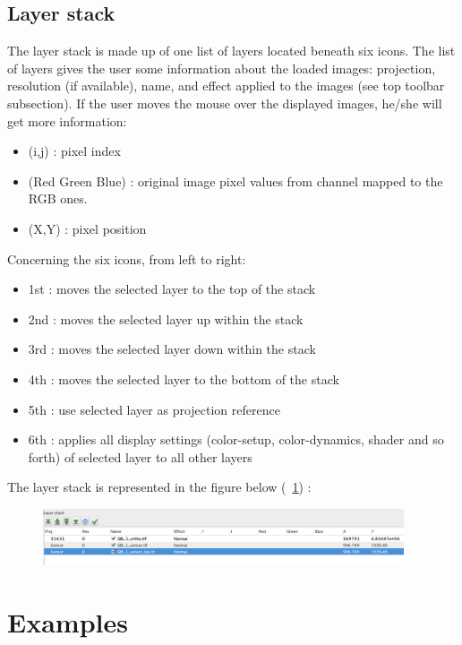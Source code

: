 \subsection{Layer stack}

The layer stack is made up of one list of layers located beneath six icons.
The list of layers gives the user some information about the loaded images:
projection, resolution (if available), name, and effect applied to the images (see top toolbar subsection).
If the user moves the mouse over the displayed images, he/she will get more information:

\begin{itemize}
\item (i,j) : pixel index
\item (Red Green Blue) : original image pixel values from channel mapped to the RGB ones.
\item (X,Y) : pixel position
\end{itemize}

Concerning the six icons, from left to right:
\begin{itemize}
\item 1st : moves the selected layer to the top of the stack
\item 2nd : moves the selected layer up within the stack
\item 3rd : moves the selected layer down within the stack
\item 4th : moves the selected layer to the bottom of the stack
\item 5th : use selected layer as projection reference
\item 6th : applies all display settings (color-setup, color-dynamics, shader and so forth) of selected layer to all other layers
\end{itemize}

The layer stack is represented in the figure below (~\ref{fig:layerstack}) :
\begin{figure}[!h] 
  \center
  \includegraphics[width=0.95\textwidth]{../Art/MonteverdiImages/layerstack.png}
  \label{fig:layerstack}
\end{figure}


\section{Examples}\label{sec:monexamples}

